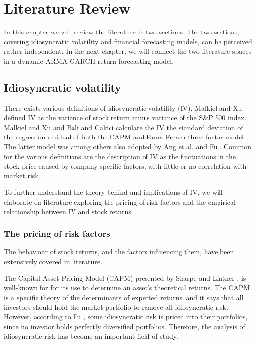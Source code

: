 \chapter{Literature Review}
\label{LR}

In this chapter we will review the literature in two sections. The two sections, covering idiosyncratic volatility and financial forecasting models, can be perceived rather independent. In the next chapter, we will connect the two literature spaces in a dynamic ARMA-GARCH return forecasting model. 

\section{Idiosyncratic volatility}
There exists various definitions of idiosyncratic volatility (IV). Malkiel and Xu \cite{malkielxu97} defined IV as the variance of stock return minus variance of the S\&P 500 index. Malkiel and Xu \cite{malkielxu04} and Bali and Cakici \cite{balicakici08} calculate the IV the standard deviation of the regression residual of both the CAPM and Fama-French three factor model \cite{famafrench}. The latter model was among others also adopted by Ang et al. \cite{angetal06} \cite{angetal09}  and Fu \cite{Fu}. Common for the various definitions are the description of IV as the fluctuations in the stock price caused by company-specific factors, with little or no correlation with market risk.

To further understand the theory behind and implications of IV, we will elaborate on literature exploring the pricing of risk factors and the empirical relationship between IV and stock returns.

\subsection{The pricing of risk factors}
The behaviour of stock returns, and the factors influencing them, have been extensively covered in literature. 

The Capital Asset Pricing Model (CAPM) presented by Sharpe \cite{sharpe} and Lintner \cite{litner}, is well-known for for its use to determine an asset's theoretical returns. The CAPM is a specific theory of the determinants of expected returns, and it says that all investors should hold the market portfolio to remove all idiosyncratic risk. However, according to Fu \cite{Fu}, some idiosyncratic risk is priced into their portfolios, since no investor holds perfectly diversified portfolios. Therefore, the analysis of idiosyncratic risk has become an important field of study.


